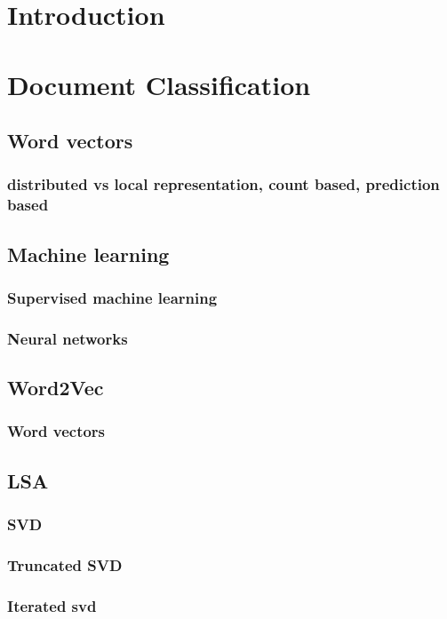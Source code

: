 \chapter*{Introduction}


\chapter{Document Classification}
    \section{Word vectors}
        \subsection{distributed vs local representation, count based, prediction based}


    \section{Machine learning}
        \subsection{Supervised machine learning}
        \subsection{Neural networks}

    \section{Word2Vec}
        \subsection{Word vectors}

    \section{LSA}
        \subsection{SVD}
        {\tiny }
        \subsection{Truncated SVD}
        \subsection{Iterated svd}

